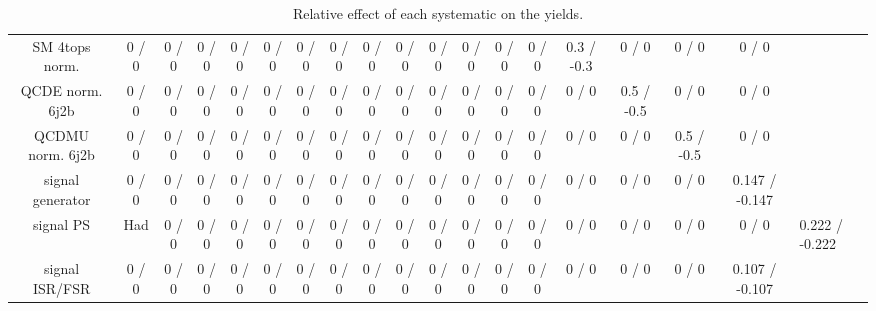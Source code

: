 \documentclass[10pt]{article}
\begin{document}
\begin{table}[htbp]
\begin{center}
\begin{tabular}{|c|c|c|c|c|c|c|c|c|c|c|c|c|c|c|c|c|c|}
  SM 4tops norm. & 0 / 0 & 0 / 0 & 0 / 0 & 0 / 0 & 0 / 0 & 0 / 0 & 0 / 0 & 0 / 0 & 0 / 0 & 0 / 0 & 0 / 0 & 0 / 0 & 0 / 0 & 0.3 / -0.3 & 0 / 0 & 0 / 0 & 0 / 0 \\ 
  QCDE norm. 6j2b & 0 / 0 & 0 / 0 & 0 / 0 & 0 / 0 & 0 / 0 & 0 / 0 & 0 / 0 & 0 / 0 & 0 / 0 & 0 / 0 & 0 / 0 & 0 / 0 & 0 / 0 & 0 / 0 & 0.5 / -0.5 & 0 / 0 & 0 / 0 \\ 
  QCDMU norm. 6j2b & 0 / 0 & 0 / 0 & 0 / 0 & 0 / 0 & 0 / 0 & 0 / 0 & 0 / 0 & 0 / 0 & 0 / 0 & 0 / 0 & 0 / 0 & 0 / 0 & 0 / 0 & 0 / 0 & 0 / 0 & 0.5 / -0.5 & 0 / 0 \\ 
  signal generator & 0 / 0 & 0 / 0 & 0 / 0 & 0 / 0 & 0 / 0 & 0 / 0 & 0 / 0 & 0 / 0 & 0 / 0 & 0 / 0 & 0 / 0 & 0 / 0 & 0 / 0 & 0 / 0 & 0 / 0 & 0 / 0 & 0.147 / -0.147 \\ 
  signal PS & Had & 0 / 0 & 0 / 0 & 0 / 0 & 0 / 0 & 0 / 0 & 0 / 0 & 0 / 0 & 0 / 0 & 0 / 0 & 0 / 0 & 0 / 0 & 0 / 0 & 0 / 0 & 0 / 0 & 0 / 0 & 0 / 0 & 0.222 / -0.222 \\ 
  signal ISR/FSR & 0 / 0 & 0 / 0 & 0 / 0 & 0 / 0 & 0 / 0 & 0 / 0 & 0 / 0 & 0 / 0 & 0 / 0 & 0 / 0 & 0 / 0 & 0 / 0 & 0 / 0 & 0 / 0 & 0 / 0 & 0 / 0 & 0.107 / -0.107 \\ 
\hline 
\end{tabular} 
\caption{Relative effect of each systematic on the yields.} 
\end{center} 
\end{table} 
\end{document}

